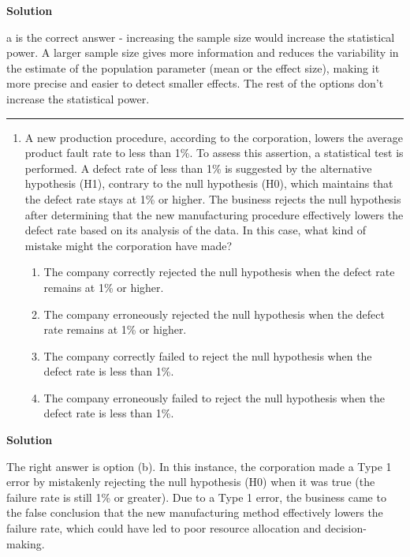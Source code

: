 \documentclass[
  letterpaper,
  DIV=11,
  numbers=noendperiod,
  oneside]{scrreprt}
\providecommand{\tightlist}{%
  \setlength{\itemsep}{0pt}\setlength{\parskip}{0pt}}\usepackage{longtable,booktabs,array}
\begin{document}
\textbf{Solution}

a is the correct answer - increasing the sample size would increase the
statistical power. A larger sample size gives more information and
reduces the variability in the estimate of the population parameter
(mean or the effect size), making it more precise and easier to detect
smaller effects. The rest of the options don't increase the statistical
power.

\begin{center}\rule{0.5\linewidth}{0.5pt}\end{center}

\begin{enumerate}
\def\labelenumi{\arabic{enumi}.}
\setcounter{enumi}{4}
\tightlist
\item
  A new production procedure, according to the corporation, lowers the
  average product fault rate to less than 1\%. To assess this assertion,
  a statistical test is performed. A defect rate of less than 1\% is
  suggested by the alternative hypothesis (H1), contrary to the null
  hypothesis (H0), which maintains that the defect rate stays at 1\% or
  higher. The business rejects the null hypothesis after determining
  that the new manufacturing procedure effectively lowers the defect
  rate based on its analysis of the data. In this case, what kind of
  mistake might the corporation have made?

  \begin{enumerate}
  \def\labelenumii{\alph{enumii}.}
  \tightlist
  \item
    The company correctly rejected the null hypothesis when the defect
    rate remains at 1\% or higher.
  \item
    The company erroneously rejected the null hypothesis when the defect
    rate remains at 1\% or higher.
  \item
    The company correctly failed to reject the null hypothesis when the
    defect rate is less than 1\%.
  \item
    The company erroneously failed to reject the null hypothesis when
    the defect rate is less than 1\%.
  \end{enumerate}
\end{enumerate}

\textbf{Solution}

The right answer is option (b). In this instance, the corporation made a
Type 1 error by mistakenly rejecting the null hypothesis (H0) when it
was true (the failure rate is still 1\% or greater). Due to a Type 1
error, the business came to the false conclusion that the new
manufacturing method effectively lowers the failure rate, which could
have led to poor resource allocation and decision-making.
\end{document}
